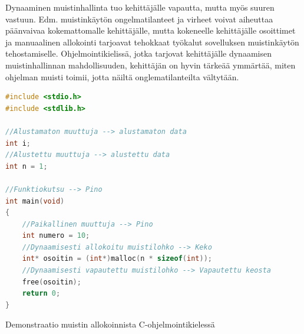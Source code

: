 Dynaaminen muistinhallinta tuo kehittäjälle vapautta, mutta myös suuren vastuun. Edm. muistinkäytön ongelmatilanteet ja virheet voivat aiheuttaa päänvaivaa kokemattomalle kehittäjälle, mutta kokeneelle kehittäjälle osoittimet ja manuaalinen allokointi tarjoavat tehokkaat työkalut sovelluksen muistinkäytön tehostamiselle. Ohjelmointikielissä, jotka tarjovat kehittäjälle dynaamisen muistinhallinnan mahdollisuuden, kehittäjän on hyvin tärkeää ymmärtää, miten ohjelman muisti toimii, jotta näiltä onglematilanteilta vältytään.

\begin{algorithm}[tbh]
\begin{lstlisting}[language=C]
#include <stdio.h>
#include <stdlib.h>

//Alustamaton muuttuja --> alustamaton data
int i;
//Alustettu muuttuja --> alustettu data 
int n = 1; 

//Funktiokutsu --> Pino
int main(void)  
{  
    //Paikallinen muuttuja --> Pino
    int numero = 10;
    //Dynaamisesti allokoitu muistilohko --> Keko    
    int* osoitin = (int*)malloc(n * sizeof(int));
    //Dynaamisesti vapautettu muistilohko --> Vapautettu keosta  
    free(osoitin);
    return 0;
}
\end{lstlisting}
\caption{Demonstraatio muistin allokoinnista C-ohjelmointikielessä\label{alg:Demonstraatio}}
\end{algorithm}
